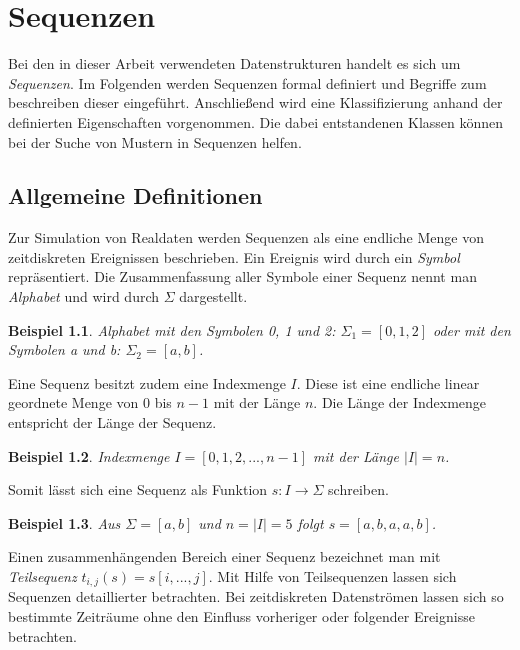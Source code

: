 \newtheorem{theorem}{Beispiel}[section]

\chapter{Sequenzen}
\label{chp:sequences}
Bei den in dieser Arbeit verwendeten Datenstrukturen handelt es sich um \textit{Sequenzen}. Im Folgenden werden Sequenzen formal definiert und Begriffe zum beschreiben dieser eingeführt. Anschließend wird eine Klassifizierung anhand der definierten Eigenschaften vorgenommen. Die dabei entstandenen Klassen können bei der Suche von Mustern in Sequenzen helfen.  

\section{Allgemeine Definitionen}
Zur Simulation von Realdaten werden Sequenzen als eine endliche Menge von zeitdiskreten Ereignissen beschrieben. Ein Ereignis wird durch ein \textit{Symbol} repräsentiert. Die Zusammenfassung aller  Symbole einer Sequenz nennt man \textit{Alphabet} und wird durch $\Sigma$ dargestellt. 
 
\begin{theorem}
Alphabet mit den Symbolen 0, 1 und 2: $\Sigma_1 = [0,1,2]$ oder mit den Symbolen a und b: $\Sigma_2 = [a,b]$. 
\end{theorem}

Eine Sequenz besitzt zudem eine Indexmenge $I$. Diese ist eine endliche linear geordnete Menge von 0 bis $n-1$ mit der Länge $n$. Die Länge der Indexmenge entspricht der Länge der Sequenz.

\begin{theorem}
Indexmenge $I = [0,1,2,...,n-1]$ mit der Länge $|I| = n$.
\end{theorem}

Somit lässt sich eine Sequenz als Funktion $s : I \rightarrow \Sigma$ schreiben.

\begin{theorem}
Aus $\Sigma = [a,b]$ und $n = |I| = 5$ folgt $s = [a,b,a,a,b]$.
\end{theorem}

Einen zusammenhängenden Bereich einer Sequenz bezeichnet man mit \textit{Teilsequenz} $t_{i,j}(s) = s[i,...,j]$. Mit Hilfe von Teilsequenzen lassen sich Sequenzen detaillierter betrachten. Bei zeitdiskreten Datenströmen lassen sich so bestimmte Zeiträume ohne den Einfluss vorheriger oder folgender Ereignisse betrachten. 

